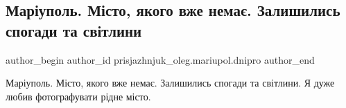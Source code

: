  
 
 
 
 

\subsection{Маріуполь. Місто, якого вже немає. Залишились спогади та світлини}
\label{sec:24_03_2022.fb.prisjazhnjuk_oleg.mariupol.dnipro.1.mar_upol__m_sto__yak}

\ifcmt
 author_begin
   author_id prisjazhnjuk_oleg.mariupol.dnipro
 author_end
\fi

Маріуполь. Місто, якого вже немає. Залишились спогади та світлини. Я дуже любив
фотографувати рідне місто.
